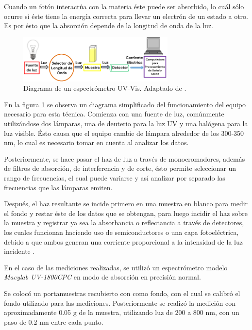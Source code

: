 \documentclass[../main.tex]{subfiles}
\begin{document}
Cuando un fotón interactúa con la materia éste puede ser absorbido, lo cuál sólo ocurre si éste tiene la energía correcta para llevar un electrón de un estado a otro. Es por ésto que la absorción depende de la longitud de onda de la luz.
\begin{figure}[H]
    \centering
    \includegraphics[width=0.7\textwidth]{fig/uvvisdiag.png}
    \caption{Diagrama de un espectrómetro UV-Vis. Adaptado de \cite{Tom2023}.}
    \label{fig:uvvisdiag}
\end{figure}
En la figura \ref{fig:uvvisdiag} se observa un diagrama simplificado del funcionamiento del equipo necesario para esta técnica. Comienza con una fuente de luz, comúnmente utilizándose dos lámparas, una de deuterio para la luz UV y una halógena para la luz visible. Ésto causa que el equipo cambie de lámpara alrededor de los 300-350 nm, lo cual es necesario tomar en cuenta al analizar los datos.

Posteriormente, se hace pasar el haz de luz a través de monocromadores, además de filtros de absorción, de interferencia y de corte, ésto permite seleccionar un rango de frecuencias, el cual puede variarse y así analizar por separado las frecuencias que las lámparas emiten.

Después, el haz resultante se incide primero en una muestra en blanco para medir el fondo y restar éste de los datos que se obtengan, para luego incidir el haz sobre la muestra y registrar ya sea la absorbancia o reflectancia a través de detectores, los cuales funcionan haciendo uso de semiconductores o una capa fotoeléctrica, debido a que ambos generan una corriente proporcional a la intensidad de la luz incidente \cite{Tom2023}.

En el caso de las mediciones realizadas, se utilizó un espectrómetro modelo \textit{Macylab UV-1800CPC} en modo de absorción en precisión normal.

Se colocó un portamuestras recubierto con  como fondo, con el cual se calibró el fondo utilizado para las mediciones. Posteriormente se realizó la medición con aproximadamente 0.05 g de la muestra, utilizando luz de 200 a 800 nm, con un paso de 0.2 nm entre cada punto.
\end{document}
